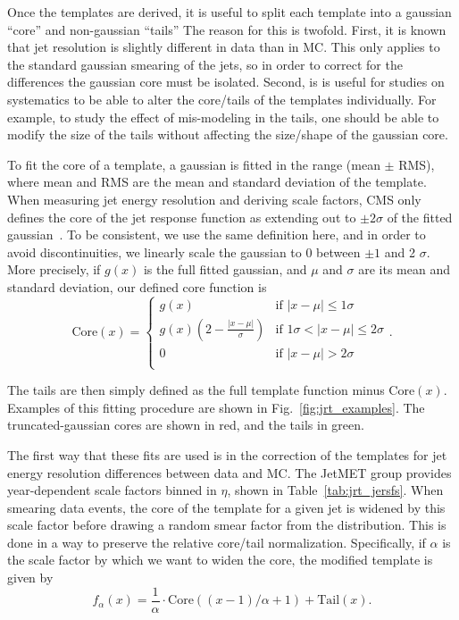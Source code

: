 Once the templates are derived, it is useful to split each template into a gaussian ``core'' and
non-gaussian ``tails'' The reason for this is twofold. First, it is known that jet resolution
is slightly different in data than in MC. This only applies to the standard gaussian smearing of the jets,
so in order to correct for the differences the gaussian core must be isolated.
Second, is is useful for studies on systematics to be able to alter the core/tails of the
templates individually. For example, to study the effect of mis-modeling in the tails,
one should be able to modify the size of the tails without affecting the size/shape
of the gaussian core.

To fit the core of a template, a gaussian is fitted in the range (mean $\pm$ RMS), where mean and RMS
are the mean and standard deviation of the template.
When measuring jet energy resolution and deriving scale factors, CMS only defines the core
of the jet response function as extending out to $\pm2\sigma$ of the fitted gaussian~\cite{JME_jes_jer}.
To be consistent, we use the same definition here, and in order to avoid discontinuities,
we linearly scale the gaussian to 0 between $\pm1$ and 2 $\sigma$. More precisely, if $g(x)$ is the
full fitted gaussian, and $\mu$ and $\sigma$ are its mean and standard deviation, our defined core function is
\[
\text{Core}(x) = 
\begin{cases}
g(x) & \text{if } |x-\mu| \leq 1\sigma \\
g(x)\left(2-\frac{|x-\mu|}{\sigma}\right) & \text{if } 1\sigma < |x-\mu| \leq 2\sigma \\
0 & \text{if } |x-\mu| > 2\sigma \\
\end{cases}.
\]

The tails are then simply defined as the full template function minus $\text{Core}(x)$.
Examples of this fitting procedure are shown in Fig.~\ref{fig:jrt_examples}. The truncated-gaussian
cores are shown in red, and the tails in green.

The first way that these fits are used is in the correction of the templates for jet energy resolution
differences between data and MC. The JetMET group provides year-dependent scale factors binned in 
$\eta$, shown in Table~\ref{tab:jrt_jersfs}. When smearing data events, the core of the template for a given jet
is widened by this scale factor before drawing a random smear factor from the distribution. This is done in a 
way to preserve the relative core/tail normalization. Specifically, if $\alpha$ is the scale factor by which we
want to widen the core, the modified template is given by
\[
f_\alpha(x) = \frac{1}{\alpha}\cdot\text{Core}((x-1)/\alpha+1) + \text{Tail}(x).
\]

